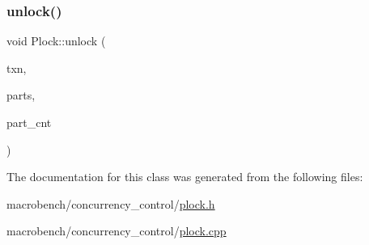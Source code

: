 \mbox{\label{classPlock_a46c8686bc53666538d48a8602b7098bc}} 
\subsubsection{\texorpdfstring{unlock()}{unlock()}}
{\footnotesize\ttfamily void Plock\+::unlock (\begin{DoxyParamCaption}\item[{\hyperlink{classtxn__man}{txn\+\_\+man} $\ast$}]{txn,  }\item[{uint64\+\_\+t $\ast$}]{parts,  }\item[{uint64\+\_\+t}]{part\+\_\+cnt }\end{DoxyParamCaption})}



The documentation for this class was generated from the following files\+:\begin{DoxyCompactItemize}
\item 
macrobench/concurrency\+\_\+control/\hyperlink{plock_8h}{plock.\+h}\item 
macrobench/concurrency\+\_\+control/\hyperlink{plock_8cpp}{plock.\+cpp}\end{DoxyCompactItemize}

